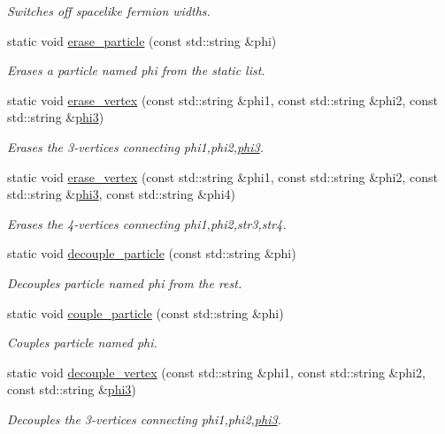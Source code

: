 \begin{DoxyCompactItemize}
\begin{DoxyCompactList}\small\item\em Switches off spacelike fermion widths. \end{DoxyCompactList}\item 
static void \hyperlink{a00370_aa517bf6e9bb16ca21999b4f96039e0d5}{erase\-\_\-particle} (const std\-::string \&phi)
\begin{DoxyCompactList}\small\item\em Erases a particle named phi from the static list. \end{DoxyCompactList}\item 
static void \hyperlink{a00370_a8b0187733197a7fcbe21004033664b72}{erase\-\_\-vertex} (const std\-::string \&phi1, const std\-::string \&phi2, const std\-::string \&\hyperlink{a00418}{phi3})
\begin{DoxyCompactList}\small\item\em Erases the 3-\/vertices connecting phi1,phi2,\hyperlink{a00418}{phi3}. \end{DoxyCompactList}\item 
static void \hyperlink{a00370_a761070785a66c0c840f1b08bece67b0f}{erase\-\_\-vertex} (const std\-::string \&phi1, const std\-::string \&phi2, const std\-::string \&\hyperlink{a00418}{phi3}, const std\-::string \&phi4)
\begin{DoxyCompactList}\small\item\em Erases the 4-\/vertices connecting phi1,phi2,str3,str4. \end{DoxyCompactList}\item 
static void \hyperlink{a00370_a46c5d085b3af9acdfe0784662f572e28}{decouple\-\_\-particle} (const std\-::string \&phi)
\begin{DoxyCompactList}\small\item\em Decouples particle named phi from the rest. \end{DoxyCompactList}\item 
static void \hyperlink{a00370_af843c90460f953d8717728aa89d70552}{couple\-\_\-particle} (const std\-::string \&phi)
\begin{DoxyCompactList}\small\item\em Couples particle named phi. \end{DoxyCompactList}\item 
static void \hyperlink{a00370_ad9ef56b861b25d8f9440bd97f635cc40}{decouple\-\_\-vertex} (const std\-::string \&phi1, const std\-::string \&phi2, const std\-::string \&\hyperlink{a00418}{phi3})
\begin{DoxyCompactList}\small\item\em Decouples the 3-\/vertices connecting phi1,phi2,\hyperlink{a00418}{phi3}. \end{DoxyCompactList}\item 

\end{DoxyCompactItemize}
